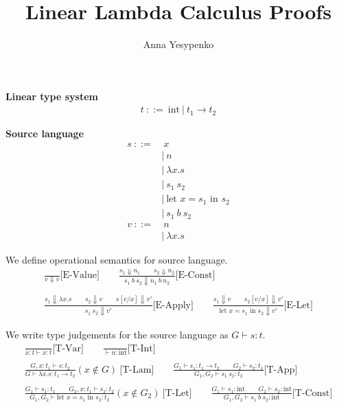 \documentclass[9pt]{article}
\renewcommand*{\int}{\text{int}}
\begin{document}
\title{Linear Lambda Calculus Proofs}
\author{Anna Yesypenko}
\maketitle

\textbf{Linear type system}
\begin{align*}
    t\ ::=\ \int\ |\ t_1 \rightarrow t_2
\end{align*}

\textbf{Source language}
\begin{align*}
    s\ ::=&\ x\\
    &|\ n\\
    &|\ \lambda x.s\\
    &|\ s_1\ s_2\\
    &|\ \text{let $x = s_1$ in $s_2$}\\
    &|\ s_1\ b\ s_2\\
    v\ ::=&\ n\\
    &|\ \lambda x.s
\end{align*}

We define operational semantics for source language.
\begin{gather*}
    \frac{}{v \Downarrow v} \text{[E-Value]} \qquad
    \frac{s_1 \Downarrow n_1 \qquad s_2 \Downarrow n_2}{s_1\ b\ s_2 \Downarrow n_1\ b\ n_2} \text{[E-Const]}\\ \\
    \frac{s_1 \Downarrow \lambda x.s \qquad s_2 \Downarrow v \qquad s[v/x] \Downarrow v'}{s_1\ s_2 \Downarrow v'} \text{[E-Apply]} \qquad 
    \frac{s_1 \Downarrow v \qquad s_2[v/x] \Downarrow v'}{\text{let $x = s_1$ in $s_2$} \Downarrow v'}\text{[E-Let]}
\end{gather*}

We write type judgements for the source language as $G \vdash s : t$.
\begin{gather*}
    \frac{}{x: t \vdash x: t} \text{[T-Var]} \qquad
    \frac{}{\vdash n : \int} \text{[T-Int]}\\ \\
    \frac{G, x: t_1 \vdash s : t_2}{G \vdash \lambda x.s : t_1 \rightarrow t_2} (x \notin G)\ \text{[T-Lam]} \qquad
    \frac{G_1 \vdash s_1 : t_1 \rightarrow t_2 \qquad G_2 \vdash s_2: t_1}{G_1, G_2 \vdash s_1\ s_2 : t_2} \text{[T-App]}\\ \\
    \frac{G_1 \vdash s_1 : t_1 \qquad G_2, x:t_1 \vdash s_2: t_2}{G_1, G_2 \vdash \text{let $x = s_1$ in $s_2$}: t_2} (x \notin G_2)\ \text{[T-Let]} \qquad
    \frac{G_1 \vdash s_1 : \int \qquad G_2 \vdash s_2 : \int}{G_1, G_2 \vdash s_1\ b\ s_2 : \int} \text{[T-Const]}
\end{gather*}
\end{document}
